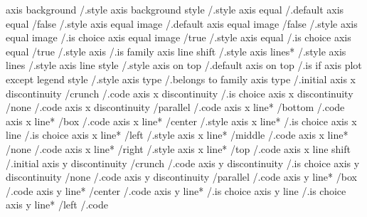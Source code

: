 axis background                                 /.style            
axis background style                           /.style            
axis equal                                      /.default          
axis equal                   /false             /.style
axis equal image                                /.default          
axis equal image             /false             /.style
axis equal image                                /.is choice
axis equal image             /true              /.style
axis equal                                      /.is choice
axis equal                   /true              /.style
axis                                            /.is family
axis line shift                                 /.style            
axis lines*                                     /.style            
axis lines                                      /.style            
axis line style                                 /.style            
axis on top                                     /.default          
axis on top                                     /.is if            
axis plot except legend style                   /.style            
axis type                                       /.belongs to family
axis type                                       /.initial          
axis x discontinuity         /crunch            /.code
axis x discontinuity                            /.is choice
axis x discontinuity         /none              /.code
axis x discontinuity         /parallel          /.code
axis x line*                 /bottom            /.code
axis x line*                 /box               /.code
axis x line*                 /center            /.style
axis x line*                                    /.is choice
axis x line                                     /.is choice
axis x line*                 /left              /.style
axis x line*                 /middle            /.code
axis x line*                 /none              /.code
axis x line*                 /right             /.style
axis x line*                 /top               /.code
axis x line shift                               /.initial
axis y discontinuity         /crunch            /.code
axis y discontinuity                            /.is choice
axis y discontinuity         /none              /.code
axis y discontinuity         /parallel          /.code
axis y line*                 /box               /.code
axis y line*                 /center            /.code
axis y line*                                    /.is choice
axis y line                                     /.is choice
axis y line*                 /left              /.code
